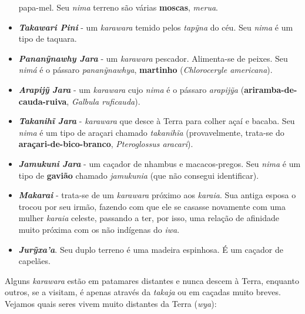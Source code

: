 \begin{itemize}
  papa-mel. Seu \emph{nima} terreno são várias \textbf{moscas},
  \emph{merua}.
\item
  \emph{\textbf{Takawari Pini}} - um \emph{karawara} temido pelos
  \emph{tapỹna} do céu. Seu \emph{nima} é um tipo de taquara.
\item
  \emph{\textbf{Pananỹnawhy Jara}} - um \emph{karawara} pescador.
  Alimenta-se de peixes. Seu \emph{nimá} é o pássaro
  \emph{pananỹnawhya}, \textbf{martinho} (\emph{Chloroceryle
  americana}).
\item
  \textbf{\emph{Arapijỹ} \emph{Jara}} - um \emph{karawara} cujo
  \emph{nima} é o pássaro \emph{arapijỹa}
  (\textbf{ariramba-de-cauda-ruiva}, \emph{Galbula ruficauda}).
\item
  \textbf{\emph{Takanihĩ Jara}} - \emph{karawara} que desce à Terra para
  colher açaí e bacaba. Seu \emph{nima} é um tipo de araçari chamado
  \emph{takanihĩa} (provavelmente, trata-se do
  \textbf{araçari-de-bico-branco}, \emph{Pteroglossus aracari}).
\item
  \textbf{\emph{Jamukuni} \emph{Jara}} - um caçador de nhambus e
  macacos-pregos. Seu \emph{nima} é um tipo de \textbf{gavião} chamado
  \emph{jamukunia} (que não consegui identificar).
\item
  \emph{\textbf{Makarai}} - trata-se de um \emph{karawara} próximo aos
  \emph{karaia}. Sua antiga esposa o trocou por seu irmão, fazendo com
  que ele se casasse novamente com uma mulher \emph{karaia} celeste,
  passando a ter, por isso, uma relação de afinidade muito próxima com
  os não indígenas do \emph{iwa}.
\item
  \emph{\textbf{Jurỹxa'a}}. Seu duplo terreno é uma madeira espinhosa. É
  um caçador de capelães.
\end{itemize}

Alguns \emph{karawara} estão em patamares distantes e nunca descem à
Terra, enquanto outros, se a visitam, é apenas através da \emph{takaja}
ou em caçadas muito breves. Vejamos quais seres vivem muito distantes da
Terra (\emph{wya}):

